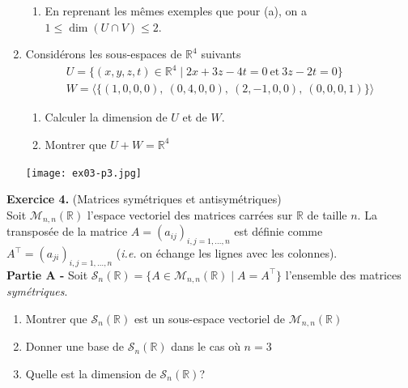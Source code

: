 \documentclass[a4paper, 10pt]{report}
\begin{document}
\begin{enumerate}[label=\arabic*.]
{\begin{minipage}{0.9\textwidth}
\begin{enumerate}[label=(\alph*)]
					\vspace{12pt}
					\item En reprenant les mêmes exemples que pour (a),
					on a $1 \leq \dim(U \cap V) \leq 2$.
				\end{enumerate}
			\end{minipage}
		}
		\item Considérons les sous-espaces de $\mathbb{R}^4$ suivants
		\begin{gather*}
			U = \{
				(x, y, z, t) \in \mathbb{R}^4 \mid 2x + 3z - 4t = 0\
				\text{et}\ 3z -2t = 0
				\} \\
			W = \Big\langle\{
				(1, 0, 0, 0),\ (0, 4, 0, 0),\ (2, -1, 0, 0),\ (0,0,0,1)
				\}\Big\rangle
		\end{gather*}
		\begin{enumerate}[label=(\alph*)]
			\item Calculer la dimension de $U$ et de $W$.
			\item Montrer que $U + W = \mathbb{R}^4$
		\end{enumerate}
		
		\texttt{[image: ex03-p3.jpg]}
	\end{enumerate}
	
	
	
	\vspace{5mm}
	\noindent
	\textbf{Exercice 4.} (Matrices symétriques et antisymétriques)\\
	Soit $\mathcal{M}_{n, n}(\mathbb{R})$ l'espace vectoriel des matrices
	carrées sur $\mathbb{R}$ de taille $n$. La transposée de la matrice
	$A = (a_{ij})_{i, j = 1, \dotsc, n}$ est définie comme
	$A^{\top} = (a_{ji})_{i, j = 1, \dotsc, n}$ (\textit{i.e.} on échange
	les lignes avec les colonnes).\\
	
	\textbf{Partie A -} Soit $\mathcal{S}_n(\mathbb{R})
		= \{A \in \mathcal{M}_{n, n}(\mathbb{R}) \mid A = A^{\top}\}$
	l'ensemble des matrices \textit{symétriques}.
	\begin{enumerate}[label=\arabic*.]
		\item Montrer que $\mathcal{S}_n(\mathbb{R})$ est un sous-espace
		vectoriel de $\mathcal{M}_{n, n}(\mathbb{R})$
		\item Donner une base de $\mathcal{S}_n(\mathbb{R})$ dans le cas
		où $n = 3$
		\item Quelle est la dimension de $\mathcal{S}_n(\mathbb{R})$?
		\\
	\end{enumerate}
	
\end{document}
